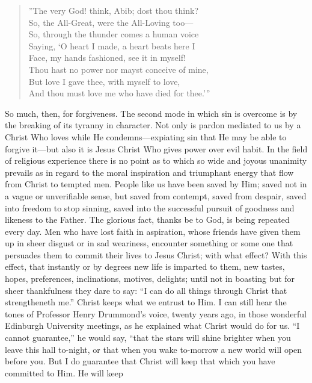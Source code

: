 \documentclass[12pt,a5paper,oneside]{book}
\begin{document}
\begin{verse}
\small 
''The very God! think, Abib; dost thou think? \\
So, the All-Great, were the All-Loving too---\\
So, through the thunder comes a human voice\\
Saying, `O heart I made, a heart beats here I\\
Face, my hands fashioned, see it in myself!\\
Thou hast no power nor mayst conceive of mine,\\
But love I gave thee, with myself to love,\\
And thou must love me who have died for thee.'''
\end{verse}

So much, then, for forgiveness. The second
mode in which sin is overcome is by the breaking 
of its tyranny in character. Not only is
pardon mediated to us by a Christ Who loves
while He condemns---expiating sin that He may
be able to forgive it---but also it is Jesus Christ
Who gives power over evil habit. In the field
of religious experience there is no point
as to which so wide and joyous unanimity
prevails as in regard to the moral inspiration 
and triumphant energy that flow from
Christ to tempted men. People like us have
been saved by Him; saved not in a vague
or unverifiable sense, but saved from contempt, 
saved from despair, saved into freedom
to stop sinning, saved into the successful pursuit 
of goodness and likeness to the Father.
The glorious fact, thanks be to God, is being
repeated every day. Men who have lost faith in
aspiration, whose friends have given them up
in sheer disgust or in sad weariness, encounter
something or some one that persuades them to
commit their lives to Jesus Christ; with what
effect? With this effect, that instantly or by
degrees new life is imparted to them, new
tastes, hopes, preferences, inclinations, motives,
delights; until not in boasting but for sheer
thankfulness they dare to say: ``I can do all
things through Christ that strengtheneth me.''
Christ keeps what we entrust to Him. I can still
hear the tones of Professor Henry Drummond's
voice, twenty years ago, in those wonderful
Edinburgh University meetings, as he explained 
what Christ would do for us. ``I
cannot guarantee,'' he would say, ``that the
stars will shine brighter when you leave this
hall to-night, or that when you wake to-morrow
a new world will open before you. But I do
guarantee that Christ will keep that which
you have committed to Him. He will keep
\end{document}
